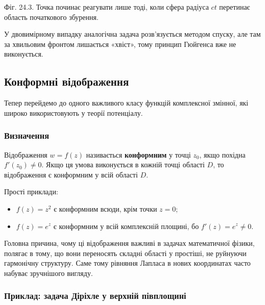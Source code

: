 \documentclass[
  ukrainian,
]{article}
\providecommand{\tightlist}{%
  \setlength{\itemsep}{0pt}\setlength{\parskip}{0pt}}
\begin{document}
Фіг. 24.3. Точка починає реагувати лише тоді, коли сфера радіуса \(ct\)
перетинає область початкового збурення.

У двовимірному випадку аналогічна задача розв'язується методом спуску,
але там за хвильовим фронтом лишається «хвіст», тому принцип Гюйгенса
вже не виконується.

\subsection{Конформні
відображення}\label{ux43aux43eux43dux444ux43eux440ux43cux43dux456-ux432ux456ux434ux43eux431ux440ux430ux436ux435ux43dux43dux44f}

Тепер перейдемо до одного важливого класу функцій комплексної змінної,
які широко використовують у теорії потенціалу.

\subsubsection{Визначення}\label{ux432ux438ux437ux43dux430ux447ux435ux43dux43dux44f}

Відображення \(w=f(z)\) називається \textbf{конформним} у точці \(z_0\),
якщо похідна \(f'(z_0)\neq 0\). Якщо ця умова виконується в кожній точці
області \(D\), то відображення є конформним у всій області \(D\).

Прості приклади:

\begin{itemize}
\tightlist
\item
  \(f(z)=z^2\) є конформним всюди, крім точки \(z=0\);
\item
  \(f(z)=e^z\) є конформним у всій комплексній площині, бо
  \(f'(z)=e^z\neq 0\).
\end{itemize}

Головна причина, чому ці відображення важливі в задачах математичної
фізики, полягає в тому, що вони переносять складні області у простіші,
не руйнуючи гармонічну структуру. Саме тому рівняння Лапласа в нових
координатах часто набуває зручнішого вигляду.

\subsubsection{Приклад: задача Діріхле у верхній
півплощині}\label{ux43fux440ux438ux43aux43bux430ux434-ux437ux430ux434ux430ux447ux430-ux434ux456ux440ux456ux445ux43bux435-ux443-ux432ux435ux440ux445ux43dux456ux439-ux43fux456ux432ux43fux43bux43eux449ux438ux43dux456}
\end{document}
